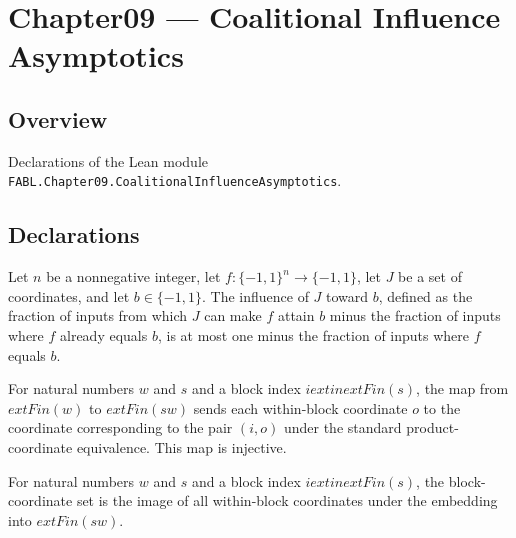 \chapter{Chapter09 — Coalitional Influence Asymptotics}
\section{Overview}

Declarations of the Lean module \texttt{FABL.Chapter09.CoalitionalInfluenceAsymptotics}.

\section{Declarations}

\begin{theorem}
\label{FABL.coalitionalInfluenceToward_le_complement_probability}
\leanok
{}
Let $n$ be a nonnegative integer, let $f:\{-1,1\}^n\to\{-1,1\}$, let $J$ be a set of
coordinates, and let $b\in\{-1,1\}$. The influence of $J$ toward $b$, defined as the
fraction of inputs from which $J$ can make $f$ attain $b$ minus the fraction of inputs
where $f$ already equals $b$, is at most one minus the fraction of inputs where $f$
equals $b$.
\end{theorem}

\begin{definition}
\label{FABL.tribesBlockEmbedding}
\leanok
For natural numbers $w$ and $s$ and a block index $i 	ext{ in } 	ext{Fin}(s)$, the map
from $	ext{Fin}(w)$ to $	ext{Fin}(sw)$ sends each within-block coordinate $o$ to the
coordinate corresponding to the pair $(i,o)$ under the standard product-coordinate
equivalence. This map is injective.
\end{definition}

\begin{definition}
\label{FABL.tribesBlockCoordinates}
\leanok
{}
For natural numbers $w$ and $s$ and a block index $i 	ext{ in } 	ext{Fin}(s)$, the
block-coordinate set is the image of all within-block coordinates under the embedding
into $	ext{Fin}(sw)$.
\end{definition}

